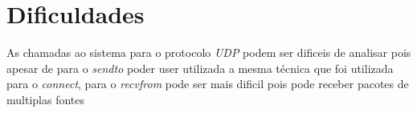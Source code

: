 \section{Dificuldades}
 As chamadas ao sistema para o protocolo \textit{UDP} podem ser dificeis de analisar pois apesar de para o \textit{sendto} poder user utilizada a mesma técnica que foi utilizada para o \textit{connect}, para o \textit{recvfrom} pode ser mais dificil pois pode receber pacotes de multiplas fontes
